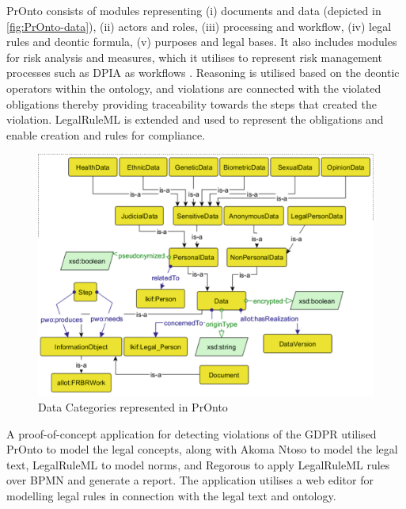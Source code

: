 PrOnto consists of modules representing (i) documents and data (depicted in \autoref{fig:PrOnto-data}), (ii) actors and roles, (iii) processing and workflow, (iv) legal rules and deontic formula, (v) purposes and legal bases. It also includes modules for risk analysis and measures, which it utilises to represent risk management processes such as DPIA as workflows \cite{palmirani_pronto_2018}. Reasoning is utilised based on the deontic operators within the ontology, and violations are connected with the violated obligations thereby providing traceability towards the steps that created the violation. LegalRuleML is extended and used to represent the obligations and enable creation and rules for compliance.
\begin{figure}[htbp]
    \centering
    \includegraphics[width=0.8\linewidth]{img/PrOnto_data.png}
    \caption{Data Categories represented in PrOnto \cite{palmirani_pronto_2018}}
    \label{fig:PrOnto-data}
\end{figure}

A proof-of-concept application for detecting violations of the GDPR \cite{monica_modelling_2018} utilised PrOnto to model the legal concepts, along with Akoma Ntoso to model the legal text, LegalRuleML to model norms, and Regorous to apply LegalRuleML rules over BPMN and generate a report. The application utilises a web editor for modelling legal rules in connection with the legal text and ontology.

